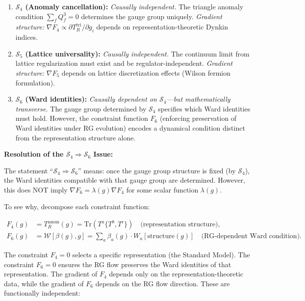 {\begin{remark}
\begin{enumerate}
\item \textbf{$\mathcal{S}_4$ (Anomaly cancellation):} \textit{Causally independent.} The triangle anomaly condition $\sum_f Q_f^3 = 0$ determines the gauge group uniquely. \textit{Gradient structure:} $\nabla F_4 \propto \partial T_R^{\text{tri}} / \partial g_i$ depends on representation-theoretic Dynkin indices.

\item \textbf{$\mathcal{S}_5$ (Lattice universality):} \textit{Causally independent.} The continuum limit from lattice regularization must exist and be regulator-independent. \textit{Gradient structure:} $\nabla F_5$ depends on lattice discretization effects (Wilson fermion formulation).

\item \textbf{$\mathcal{S}_6$ (Ward identities):} \textit{Causally dependent on $\mathcal{S}_4$---but mathematically transverse.} The gauge group determined by $\mathcal{S}_4$ specifies which Ward identities must hold. However, the constraint function $F_6$ (enforcing preservation of Ward identities under RG evolution) encodes a dynamical condition distinct from the representation structure alone.

\end{enumerate}

\textbf{Resolution of the $\mathcal{S}_4 \Rightarrow \mathcal{S}_6$ Issue:}

The statement ``$\mathcal{S}_4 \Rightarrow \mathcal{S}_6$'' means: once the gauge group structure is fixed (by $\mathcal{S}_4$), the Ward identities compatible with that gauge group are determined. However, this does NOT imply $\nabla F_6 = \lambda(g) \nabla F_4$ for some scalar function $\lambda(g)$.

To see why, decompose each constraint function:

\begin{align}
F_4(g) &= T_R^{\text{anom}}(g) = \text{Tr}(T^a \{T^b, T^c\}) \quad \text{(representation structure)}, \\
F_6(g) &= \mathcal{W}[\beta(g), g] = \sum_a \beta_a(g) \cdot W_a[\text{structure}(g)] \quad \text{(RG-dependent Ward condition)}.
\end{align}

The constraint $F_4 = 0$ selects a specific representation (the Standard Model). The constraint $F_6 = 0$ ensures the RG flow preserves the Ward identities of that representation. The gradient of $F_4$ depends only on the representation-theoretic data, while the gradient of $F_6$ depends on the RG flow direction. These are functionally independent:


\end{remark}}
